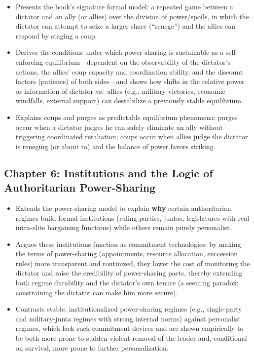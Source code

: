\documentclass[12pt]{article}
\begin{document}
\begin{itemize}[leftmargin=*, itemsep=4pt]
    \item Presents the book's signature formal model: a repeated game between a dictator and an ally (or allies) over the division of power/spoils, in which the dictator can attempt to seize a larger share (``renege'') and the allies can respond by staging a coup.
    \item Derives the conditions under which power-sharing is sustainable as a self-enforcing equilibrium---dependent on the observability of the dictator's actions, the allies' coup capacity and coordination ability, and the discount factors (patience) of both sides---and shows how shifts in the relative power or information of dictator vs.\ allies (e.g., military victories, economic windfalls, external support) can destabilize a previously stable equilibrium.
    \item Explains coups and purges as predictable equilibrium phenomena: purges occur when a dictator judges he can safely eliminate an ally without triggering coordinated retaliation; coups occur when allies judge the dictator is reneging (or about to) and the balance of power favors striking.
\end{itemize}

\subsection*{Chapter 6: Institutions and the Logic of Authoritarian Power-Sharing}

\begin{itemize}[leftmargin=*, itemsep=4pt]
    \item Extends the power-sharing model to explain \textbf{why} certain authoritarian regimes build formal institutions (ruling parties, juntas, legislatures with real intra-elite bargaining functions) while others remain purely personalist.
    \item Argues these institutions function as commitment technologies: by making the terms of power-sharing (appointments, resource allocation, succession rules) more transparent and routinized, they lower the cost of monitoring the dictator and raise the credibility of power-sharing pacts, thereby extending both regime durability and the dictator's own tenure (a seeming paradox: constraining the dictator can make him more secure).
    \item Contrasts stable, institutionalized power-sharing regimes (e.g., single-party and military-junta regimes with strong internal norms) against personalist regimes, which lack such commitment devices and are shown empirically to be both more prone to sudden violent removal of the leader and, conditional on survival, more prone to further personalization.
\end{itemize}
\end{document}
